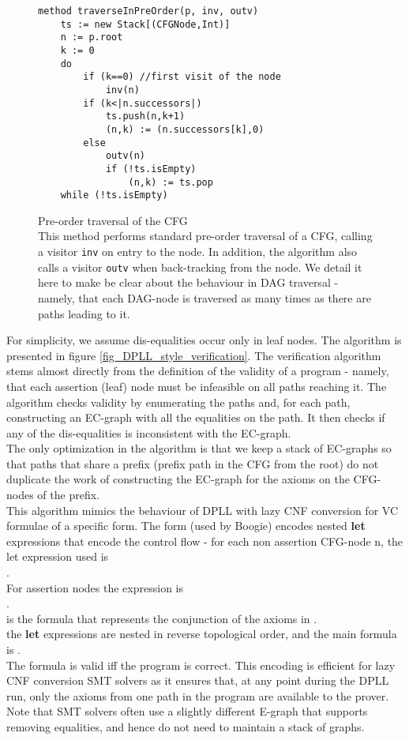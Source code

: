 \begin{figure}
\begin{lstlisting}
method traverseInPreOrder(p, inv, outv)
	ts := new Stack[(CFGNode,Int)]
	n := p.root
	k := 0
	do
		if (k==0) //first visit of the node
			inv(n)
		if (k<|n.successors|)
			ts.push(n,k+1)
			(n,k) := (n.successors[k],0)
		else
			outv(n)
			if (!ts.isEmpty)
				(n,k) := ts.pop
	while (!ts.isEmpty)
\end{lstlisting}
\caption{Pre-order traversal of the CFG\\
This method performs standard pre-order traversal of a CFG, calling a visitor \lstinline|inv| on entry to the node. In addition, the algorithm also calls a visitor \lstinline|outv| when back-tracking from the node.
We detail it here to make be clear about the behaviour in DAG traversal - namely,
that each DAG-node is traversed as many times as there are paths leading to it.
}
\label{fig_CFG_traversal}
\end{figure}

\noindent
For simplicity, we assume dis-equalities occur only in leaf nodes.
The algorithm is presented in figure \ref{fig_DPLL_style_verification}.
The verification algorithm stems almost directly from the definition of the validity of a program - namely, that each assertion (leaf) node must be infeasible on all paths reaching it. The algorithm checks validity by enumerating the paths and, for each path, constructing an EC-graph with all the equalities on the path. It then checks if any of the dis-equalities is inconsistent with the EC-graph.\\
The only optimization in the algorithm is that we keep a stack of EC-graphs so that paths that share a prefix (prefix path in the CFG from the root) do not duplicate the work of constructing the EC-graph for the axioms on the CFG-nodes of the prefix.\\
This algorithm mimics the behaviour of DPLL with lazy CNF conversion for VC formulae of a specific form. 
The form (used by Boogie) encodes nested \textbf{let} expressions that encode the control flow - for each non assertion CFG-node n,
the let expression used is \\
. \\
For assertion nodes the expression is\\
. \\
 is the formula that represents the conjunction of the axioms in .\\
the \textbf{let} expressions are nested in reverse topological order, and the main formula is .\\
The formula is valid iff the program is correct.
This encoding is efficient for lazy CNF conversion SMT solvers as it ensures that, at any point during the DPLL run,
only the axioms from one path in the program are available to the prover.\\
Note that SMT solvers often use a slightly different E-graph that supports removing equalities, and hence do not need to maintain a stack of graphs.

